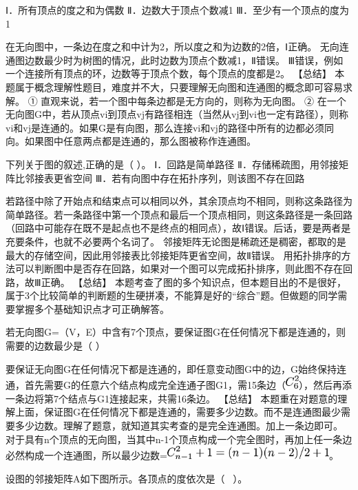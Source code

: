Ⅰ．所有顶点的度之和为偶数 Ⅱ．边数大于顶点个数减1
Ⅲ．至少有一个顶点的度为1
\par{}
\begin{solution}在无向图中，一条边在度之和中计为2，所以度之和为边数的2倍，Ⅰ正确。
无向连通图边数最少时为树图的情况，此时边数为顶点个数减1，Ⅱ错误。
Ⅲ错误，例如一个连接所有顶点的环，边数等于顶点个数，每个顶点的度都是2。
【总结】
本题属于概念理解性题目，难度并不大，只要理解无向图和连通图的概念即可容易求解。
① 直观来说，若一个图中每条边都是无方向的，则称为无向图。 ②
在一个无向图G中，若从顶点vi到顶点vj有路径相连（当然从vj到vi也一定有路径），则称vi和vj是连通的。如果G是有向图，那么连接vi和vj的路径中所有的边都必须同向。如果图中任意两点都是连通的，那么图被称作连通图。
\end{solution}
\question 下列关于图的叙述,正确的是（ ）。 Ⅰ．回路是简单路径
Ⅱ．存储稀疏图，用邻接矩阵比邻接表更省空间
Ⅲ．若有向图中存在拓扑序列，则该图不存在回路
\par{}
\begin{solution}若路径中除了开始点和结束点可以相同以外，其余顶点均不相同，则称这条路径为简单路径。若一条路径中第一个顶点和最后一个顶点相同，则这条路径是一条回路（回路中可能存在既不是起点也不是终点的相同点），故Ⅰ错误。后话，要是两者是充要条件，也就不必要两个名词了。
邻接矩阵无论图是稀疏还是稠密，都取的是最大的存储空间，因此用邻接表比邻接矩阵更省空间，故Ⅱ错误。
用拓扑排序的方法可以判断图中是否存在回路，如果对一个图可以完成拓扑排序，则此图不存在回路，故Ⅲ正确。
【总结】
本题考查了图的多个知识点，但本题目出的不是很好，属于3个比较简单的判断题的生硬拼凑，不能算是好的``综合''题。但做题的同学需要掌握多个基础知识点才可正确解答。
\end{solution}
\question 若无向图G=（V，E）中含有7个顶点，要保证图G在任何情况下都是连通的，则需要的边数最少是（
）
\par{}
\begin{solution}要保证无向图G在任何情况下都是连通的，即任意变动图G中的边，G始终保持连通，首先需要G的任意六个结点构成完全连通子图G1，需15条边（\includegraphics[width=0.19792in,height=0.19792in]{texmath/4a64ea5Cdpi7B3507DC_65E2}），然后再添一条边将第7个结点与G1连接起来，共需16条边。
【总结】
本题重在对题意的理解上面，保证图G在任何情况下都是连通的，需要多少边数。而不是连通图最少需要多少边数。理解了题意，就知道其实考查的是完全连通图。加上一条边即可。
对于具有n个顶点的无向图，当其中n-1个顶点构成一个完全图时，再加上任一条边必然构成一个连通图，所以最少边数=\includegraphics[width=2.44792in,height=0.19792in]{texmath/1a7ad05Cdpi7B3507DC_7Bn-17D5E22B13D28n-12928n-2292F22B1}。
\end{solution}
\question 设图的邻接矩阵A如下图所示。各顶点的度依次是（ ~）。~

